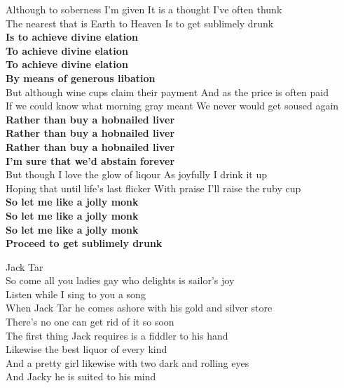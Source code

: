 \documentclass[letterpaper,9pt]{article}
\begin{document}
Although to soberness I'm given It is a thought I've often thunk \\
The nearest that is Earth to Heaven Is to get sublimely drunk \\

\textbf{Is to achieve divine elation \\
To achieve divine elation \\
To achieve divine elation \\
By means of generous libation} \\

But although wine cups claim their payment And as the price is often paid \\
If we could know what morning gray meant We never would get soused again \\

\textbf{Rather than buy a hobnailed liver \\
Rather than buy a hobnailed liver \\
Rather than buy a hobnailed liver \\
I'm sure that we'd abstain forever} \\

But though I love the glow of liqour As joyfully I drink it up \\
Hoping that until life's last flicker With praise I'll raise the ruby cup \\

\textbf{So let me like a jolly monk \\
So let me like a jolly monk \\
So let me like a jolly monk \\
Proceed to get sublimely drunk} \\

\newpage
{}
\Huge
Jack Tar\\

\Large
So come all you ladies gay who delights is sailor’s joy \\
Listen while I sing to you a song \\
When Jack Tar he comes ashore with his gold and silver store \\
There’s no one can get rid of it so soon \\

The first thing Jack requires is a fiddler to his hand \\
Likewise the best liquor of every kind \\
And a pretty girl likewise with two dark and rolling eyes \\
And Jacky he is suited to his mind \\
\end{document}
